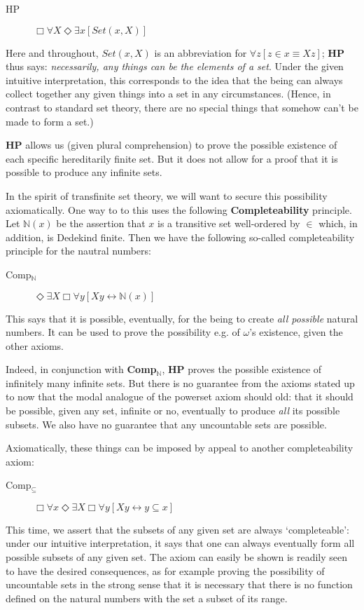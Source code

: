 \documentclass{article}
\begin{document}
\begin{description} 
    \item[HP] $\Box \forall X \Diamond \exists x [Set(x, X)]$
\end{description}
Here and throughout, $Set(x, X)$ is an abbreviation for 
$\forall z[z \in x \equiv Xz]$; {\bf HP} thus says: \emph{necessarily, any 
things can be the elements of a set}. Under the given 
intuitive interpretation, this corresponds to the idea that the being 
can always collect together any given things into a set in any circumstances.  
(Hence, in contrast to standard set theory, there are no 
special things that somehow can't be made to form a set.)

{\bf HP} allows us (given plural comprehension) to prove the possible existence 
of each specific hereditarily finite set. But it does not allow for a proof that 
it is possible to produce any infinite sets. 

In the spirit of transfinite 
set theory, we will want to secure this possibility axiomatically. 
One way to to this uses the following {\bf Completeability} principle. 
Let $\mathbb{N}(x)$ be the assertion that $x$ is a transitive set well-ordered 
by $\in$ which, in addition, is Dedekind finite. Then we have the following 
so-called completeability principle for the nautral numbers:
\begin{description}
    \item[Comp$_\mathbb{N}$]
    $\Diamond \exists X \Box \forall y[ Xy \leftrightarrow \mathbb{N}(x)]$
\end{description}
This says that it is possible, eventually, for the being to create \emph{all possible}
natural numbers. It can be used to prove the possibility 
e.g. of $\omega$'s existence, given the other axioms.

Indeed, in conjunction with {\bf Comp$_\mathbb{N}$}, 
{\bf HP} proves the possible existence of infinitely many
infinite sets. But there is no guarantee from the axioms stated up to now that 
the modal analogue of the powerset axiom should old: that it should be possible, 
given any set, infinite or no, eventually to produce \emph{all} its possible subsets. 
We also have no guarantee that any uncountable sets are possible.

Axiomatically, these things can be imposed by appeal to another completeability axiom:
\begin{description}
    \item[Comp$_\subseteq$]
    $\Box \forall x \Diamond \exists X \Box \forall y[ Xy \leftrightarrow y \subseteq x]$
\end{description}
This time, we assert that the subsets of any given set are always `completeable': 
under our intuitive interpretation, 
it says that one can always eventually form all possible subsets of any given set. 
The axiom can easily be shown is readily seen to have the desired consequences, as 
for example proving the possibility of uncountable sets in the strong sense that 
it is necessary that there is no function defined on the natural numbers with the set 
a subset of its range.
\end{document}

